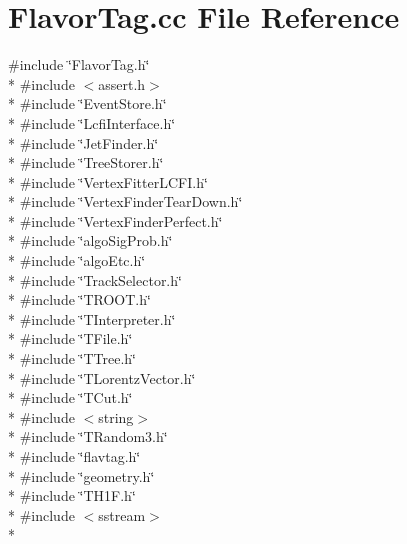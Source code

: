 \section{Flavor\-Tag.\-cc File Reference}
\label{FlavorTag_8cc}
{\ttfamily \#include \char`\"{}Flavor\-Tag.\-h\char`\"{}}\\*
{\ttfamily \#include $<$assert.\-h$>$}\\*
{\ttfamily \#include \char`\"{}Event\-Store.\-h\char`\"{}}\\*
{\ttfamily \#include \char`\"{}Lcfi\-Interface.\-h\char`\"{}}\\*
{\ttfamily \#include \char`\"{}Jet\-Finder.\-h\char`\"{}}\\*
{\ttfamily \#include \char`\"{}Tree\-Storer.\-h\char`\"{}}\\*
{\ttfamily \#include \char`\"{}Vertex\-Fitter\-L\-C\-F\-I.\-h\char`\"{}}\\*
{\ttfamily \#include \char`\"{}Vertex\-Finder\-Tear\-Down.\-h\char`\"{}}\\*
{\ttfamily \#include \char`\"{}Vertex\-Finder\-Perfect.\-h\char`\"{}}\\*
{\ttfamily \#include \char`\"{}algo\-Sig\-Prob.\-h\char`\"{}}\\*
{\ttfamily \#include \char`\"{}algo\-Etc.\-h\char`\"{}}\\*
{\ttfamily \#include \char`\"{}Track\-Selector.\-h\char`\"{}}\\*
{\ttfamily \#include \char`\"{}T\-R\-O\-O\-T.\-h\char`\"{}}\\*
{\ttfamily \#include \char`\"{}T\-Interpreter.\-h\char`\"{}}\\*
{\ttfamily \#include \char`\"{}T\-File.\-h\char`\"{}}\\*
{\ttfamily \#include \char`\"{}T\-Tree.\-h\char`\"{}}\\*
{\ttfamily \#include \char`\"{}T\-Lorentz\-Vector.\-h\char`\"{}}\\*
{\ttfamily \#include \char`\"{}T\-Cut.\-h\char`\"{}}\\*
{\ttfamily \#include $<$string$>$}\\*
{\ttfamily \#include \char`\"{}T\-Random3.\-h\char`\"{}}\\*
{\ttfamily \#include \char`\"{}flavtag.\-h\char`\"{}}\\*
{\ttfamily \#include \char`\"{}geometry.\-h\char`\"{}}\\*
{\ttfamily \#include \char`\"{}T\-H1\-F.\-h\char`\"{}}\\*
{\ttfamily \#include $<$sstream$>$}\\*
